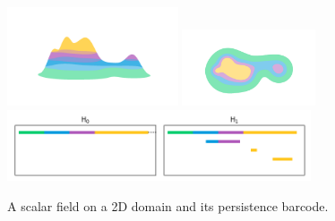 \begin{figure}[htbp]
  \centering
  \includegraphics[trim=200 200 200 200, clip, width=0.45\textwidth]{figures/surf/side.png}
  \includegraphics[trim=250 0 50 100, clip, width=0.35\textwidth]{figures/surf/top.png}
  \includegraphics[width=0.8\textwidth]{figures/scalar_barcode_true.png}
  \caption{A scalar field on a 2D domain and its persistence barcode.}
\end{figure}
